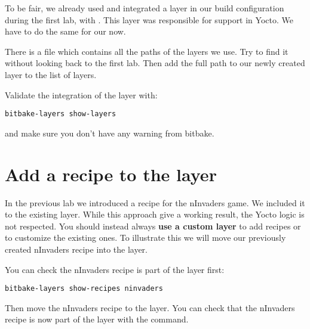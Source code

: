 To be fair, we already used and integrated a layer in our build configuration
during the first lab, with 
{} {}. This layer was responsible for  {} {} support in Yocto. We have to do the same for our
 now.

There is a file which contains all the paths of the layers we use. Try to find it
without looking back to the first lab. Then add the full path to our newly
created layer to the list of layers.

Validate the integration of the  layer with:
\begin{verbatim}
bitbake-layers show-layers
\end{verbatim}

and make sure you don't have any warning from bitbake.

\section{Add a recipe to the layer}

In the previous lab we introduced a recipe for the nInvaders game. We included
it to the existing  layer. While this approach give a working result,
the Yocto logic is not respected. You should instead always \textbf{use a custom layer}
to add recipes or to customize the existing ones. To illustrate this we will
move our previously created nInvaders recipe into the  layer.

You can check the nInvaders recipe is part of the  layer first:
\begin{verbatim}
bitbake-layers show-recipes ninvaders
\end{verbatim}

Then move the nInvaders recipe to the  layer. You can check that
the nInvaders recipe is now part of the layer with the  command.
